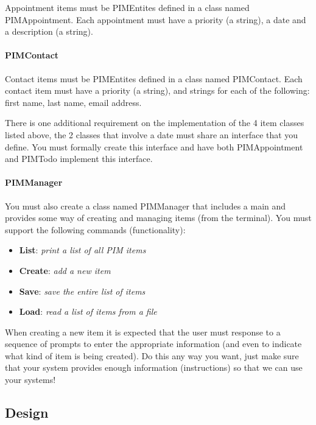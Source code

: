 \documentclass{article}
\begin{document}
Appointment items must be PIMEntites defined in a class named PIMAppointment. Each appointment must have a priority (a string),
a date and a description (a string).

\paragraph{PIMContact}

Contact items must be PIMEntites defined in a class named PIMContact. Each contact item must have a priority (a string), and strings for each of the following: first name, last name, email address.

There is one additional requirement on the implementation of the 4 item classes listed above, the 2 classes that involve a date must share an interface that you define. You must formally create this interface and have both PIMAppointment and PIMTodo implement this interface.

\paragraph{PIMManager}

You must also create a class named PIMManager that includes a main and provides some way of creating and managing items (from the terminal). You must support the following commands (functionality):

\begin{itemize}
\item \textbf{List}: \textit{print a list of all PIM items}
\item \textbf{Create}: \textit{add a new item}
\item \textbf{Save}: \textit{save the entire list of items}
\item \textbf{Load}: \textit{read a list of items from a file}
\end{itemize}

When creating a new item it is expected that the user must response to a sequence of prompts to enter the appropriate information
(and even to indicate what kind of item is being created). Do this any way you want, just make sure that your system provides enough
information (instructions) so that we can use your systems!

\subsection{Design}
\label{sec:pim:design}
\end{document}
